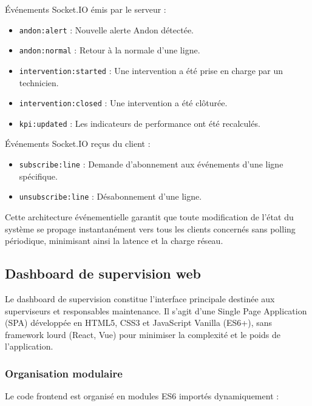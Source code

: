 Événements Socket.IO émis par le serveur :
\begin{itemize}
    \item \texttt{andon:alert} : Nouvelle alerte Andon détectée.
    \item \texttt{andon:normal} : Retour à la normale d'une ligne.
    \item \texttt{intervention:started} : Une intervention a été prise en charge par un technicien.
    \item \texttt{intervention:closed} : Une intervention a été clôturée.
    \item \texttt{kpi:updated} : Les indicateurs de performance ont été recalculés.
\end{itemize}

Événements Socket.IO reçus du client :
\begin{itemize}
    \item \texttt{subscribe:line} : Demande d'abonnement aux événements d'une ligne spécifique.
    \item \texttt{unsubscribe:line} : Désabonnement d'une ligne.
\end{itemize}

Cette architecture événementielle garantit que toute modification de l'état du système se propage instantanément vers tous les clients concernés sans polling périodique, minimisant ainsi la latence et la charge réseau.


\subsection{Dashboard de supervision web}

Le dashboard de supervision constitue l'interface principale destinée aux superviseurs et responsables maintenance. Il s'agit d'une Single Page Application (SPA) développée en HTML5, CSS3 et JavaScript Vanilla (ES6+), sans framework lourd (React, Vue) pour minimiser la complexité et le poids de l'application.

\subsubsection{Organisation modulaire}

Le code frontend est organisé en modules ES6 importés dynamiquement :

